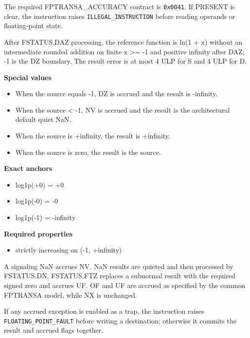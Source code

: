 The required FPTRANSA\_ACCURACY contract is \texttt{0x0041}. If PRESENT is clear, the instruction raises \texttt{ILLEGAL\_INSTRUCTION} before reading operands or floating-point state.

After FSTATUS.DAZ processing, the reference function is ln(1 + x) without an intermediate rounded addition on finite x \textgreater{}= -1 and positive infinity after DAZ; -1 is the DZ boundary. The result error is at most 4 ULP for S and 4 ULP for D.

\textbf{Special values}\par
\begin{itemize}
\item When the source equals -1, DZ is accrued and the result is -infinity.
\item When the source \textless{} -1, NV is accrued and the result is the architectural default quiet NaN.
\item When the source is +infinity, the result is +infinity.
\item When the source is zero, the result is the source.
\end{itemize}

\textbf{Exact anchors}\par
\begin{itemize}
\item log1p(+0) = +0
\item log1p(-0) = -0
\item log1p(-1) = -infinity
\end{itemize}

\textbf{Required properties}\par
\begin{itemize}
\item strictly increasing on (-1, +infinity)
\end{itemize}

A signaling NaN accrues NV. NaN results are quieted and then processed by FSTATUS.DN. FSTATUS.FTZ replaces a subnormal result with the required signed zero and accrues UF. OF and UF are accrued as specified by the common FPTRANSA model, while NX is unchanged.

If any accrued exception is enabled as a trap, the instruction raises \texttt{FLOATING\_POINT\_FAULT} before writing a destination; otherwise it commits the result and accrued flags together.

